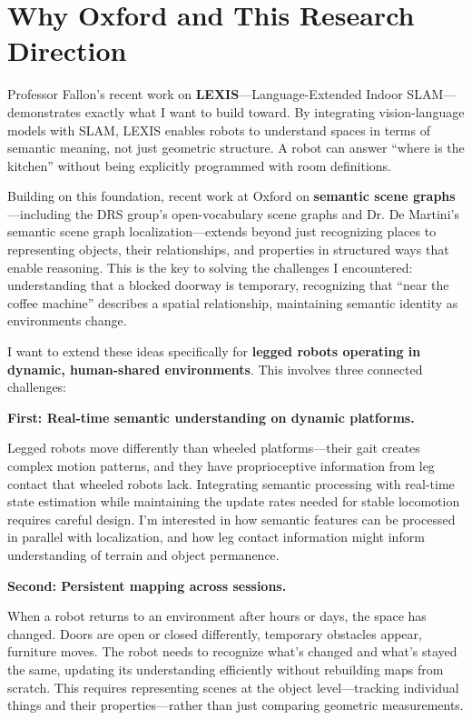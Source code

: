 \documentclass[12pt]{article}
\begin{document}
\section*{Why Oxford and This Research Direction}

Professor Fallon's recent work on \textbf{LEXIS}—Language-Extended Indoor SLAM—demonstrates exactly what I want to build toward. By integrating vision-language models with SLAM, LEXIS enables robots to understand spaces in terms of semantic meaning, not just geometric structure. A robot can answer ``where is the kitchen'' without being explicitly programmed with room definitions.

Building on this foundation, recent work at Oxford on \textbf{semantic scene graphs}—including the DRS group's open-vocabulary scene graphs and Dr. De Martini's semantic scene graph localization—extends beyond just recognizing places to representing objects, their relationships, and properties in structured ways that enable reasoning. This is the key to solving the challenges I encountered: understanding that a blocked doorway is temporary, recognizing that ``near the coffee machine'' describes a spatial relationship, maintaining semantic identity as environments change.

I want to extend these ideas specifically for \textbf{legged robots operating in dynamic, human-shared environments}. This involves three connected challenges:

\vspace{0.3cm}
\noindent\textbf{First: Real-time semantic understanding on dynamic platforms.}

Legged robots move differently than wheeled platforms—their gait creates complex motion patterns, and they have proprioceptive information from leg contact that wheeled robots lack. Integrating semantic processing with real-time state estimation while maintaining the update rates needed for stable locomotion requires careful design. I'm interested in how semantic features can be processed in parallel with localization, and how leg contact information might inform understanding of terrain and object permanence.

\vspace{0.2cm}
\noindent\textbf{Second: Persistent mapping across sessions.}

When a robot returns to an environment after hours or days, the space has changed. Doors are open or closed differently, temporary obstacles appear, furniture moves. The robot needs to recognize what's changed and what's stayed the same, updating its understanding efficiently without rebuilding maps from scratch. This requires representing scenes at the object level—tracking individual things and their properties—rather than just comparing geometric measurements.
\end{document}
